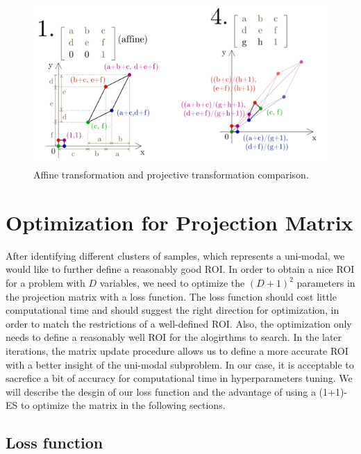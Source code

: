 \begin{figure}
\centering
\includegraphics[width=\textwidth]{Affine_vs_Projective}
\caption{Affine transformation and projective transformation comparison.}\label{fig:Affine_vs_Projective}
\end{figure}









\section{Optimization for Projection Matrix}

After identifying different clusters of samples, which represents a uni-modal, 
we would like to further define a reasonably good ROI.
In order to obtain a nice ROI for a problem with $D$ variables, 
we need to optimize the $(D+1)^2$ parameters in the projection matrix with a loss function.
The loss function should cost little computational time and should suggest the right direction for optimization, 
in order to match the restrictions of a well-defined ROI.
Also, the optimization only needs to define a reasonably well ROI for the alogirthms to search.  
In the later iterations, the matrix update procedure allows us to define a more accurate ROI with a better insight of the uni-modal subproblem.
In our case, it is acceptable to sacrefice a bit of accuracy for computational time in hyperparameters tuning.  
We will describe the desgin of our loss function and the advantage of using a (1+1)-ES to optimize the matrix in the following sections.  


\subsection{Loss function}

